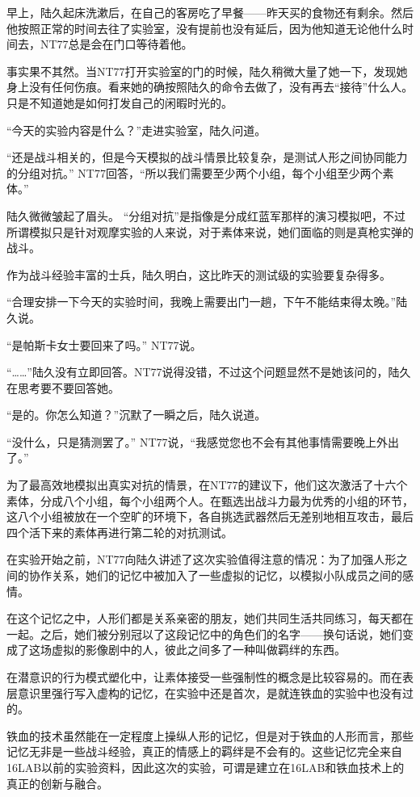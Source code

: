 早上，陆久起床洗漱后，在自己的客房吃了早餐——昨天买的食物还有剩余。然后他按照正常的时间去往了实验室，没有提前也没有延后，因为他知道无论他什么时间去，NT77总是会在门口等待着他。

事实果不其然。当NT77打开实验室的门的时候，陆久稍微大量了她一下，发现她身上没有任何伤痕。看来她的确按照陆久的命令去做了，没有再去“接待”什么人。只是不知道她是如何打发自己的闲暇时光的。

“今天的实验内容是什么？”走进实验室，陆久问道。

“还是战斗相关的，但是今天模拟的战斗情景比较复杂，是测试人形之间协同能力的分组对抗。” NT77回答，“所以我们需要至少两个小组，每个小组至少两个素体。”

陆久微微皱起了眉头。 “分组对抗”是指像是分成红蓝军那样的演习模拟吧，不过所谓模拟只是针对观摩实验的人来说，对于素体来说，她们面临的则是真枪实弹的战斗。

作为战斗经验丰富的士兵，陆久明白，这比昨天的测试级的实验要复杂得多。

“合理安排一下今天的实验时间，我晚上需要出门一趟，下午不能结束得太晚。”陆久说。

“是帕斯卡女士要回来了吗。” NT77说。

“……”陆久没有立即回答。NT77说得没错，不过这个问题显然不是她该问的，陆久在思考要不要回答她。

“是的。你怎么知道？”沉默了一瞬之后，陆久说道。

“没什么，只是猜测罢了。” NT77说，“我感觉您也不会有其他事情需要晚上外出了。”

为了最高效地模拟出真实对抗的情景，在NT77的建议下，他们这次激活了十六个素体，分成八个小组，每个小组两个人。在甄选出战斗力最为优秀的小组的环节，这八个小组被放在一个空旷的环境下，各自挑选武器然后无差别地相互攻击，最后四个活下来的素体再进行第二轮的对抗测试。

在实验开始之前，NT77向陆久讲述了这次实验值得注意的情况：为了加强人形之间的协作关系，她们的记忆中被加入了一些虚拟的记忆，以模拟小队成员之间的感情。

在这个记忆之中，人形们都是关系亲密的朋友，她们共同生活共同练习，每天都在一起。之后，她们被分别冠以了这段记忆中的角色们的名字——换句话说，她们变成了这场虚拟的影像剧中的人，彼此之间多了一种叫做羁绊的东西。

在潜意识的行为模式塑化中，让素体接受一些强制性的概念是比较容易的。而在表层意识里强行写入虚构的记忆，在实验中还是首次，是就连铁血的实验中也没有过的。

铁血的技术虽然能在一定程度上操纵人形的记忆，但是对于铁血的人形而言，那些记忆无非是一些战斗经验，真正的情感上的羁绊是不会有的。这些记忆完全来自16LAB以前的实验资料，因此这次的实验，可谓是建立在16LAB和铁血技术上的真正的创新与融合。

